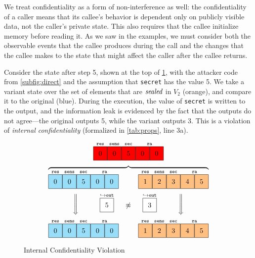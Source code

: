 \documentclass[10pt,conference]{ieeetran}%
\theoremstyle{definition}
\begin{document}
We treat confidentiality as a form of non-interference as well: the confidentiality of a caller
means that its callee's behavior is dependent only on publicly visible data,
not the caller's private state. This also requires that the callee initialize
memory before reading it.
As we saw in the examples, we must consider both the observable events
that the callee produces during the call and the changes that the callee makes to the state that might
affect the caller after the callee returns.

Consider the state after step 5, shown at the top of \cref{fig:variant2},
with the attacker code from \cref{subfig:direct} and the assumption that
{\tt secret} has the value 5. We take a variant state over
the set of elements that are \(\mathit{sealed}\) in \(V_2\) (orange), and compare it to the
original (blue). During the execution, the value of {\tt secret} is written
to the output, and the information leak is evidenced by the fact that the
outputs do not agree---the original outputs 5, while the variant outputs 3.
This is a violation of
{\it internal confidentiality} (formalized in \cref{tab:props}, line 3a).

\newcommand{\leftbox}[1][]{\genbox{20pt}{\leftvariant}{#1}}
\newcommand{\rightbox}[1][]{\genbox{20pt}{\rightvariant}{#1}}

\begin{figure}
    \centering
    \[
    \stackrel{\texttt{res}}{\figfourbox[0]}
    \stackrel{\texttt{sens}}{\figfourbox[0]}
    \stackrel{\texttt{sec}}{\figfourbox[5]}
    \stackrel{\texttt{ra}}{\figfourbox[0]\figfourbox[0]}\]
    \[\overbrace{
    \stackrel{\texttt{res}}{\leftbox[0]}
    \stackrel{\texttt{sens}}{\leftbox[0]}
    \stackrel{\texttt{sec}}{\leftbox[5]}
    \stackrel{\texttt{ra}}{\leftbox[0]\leftbox[0]}
    \hspace{1cm}
    \stackrel{\texttt{res}}{\rightbox[1]}
    \stackrel{\texttt{sens}}{\rightbox[2]}
    \stackrel{\texttt{sec}}{\rightbox[3]}
    \stackrel{\texttt{ra}}{\rightbox[4]\rightbox[5]}}
    \]
    \[\raisebox{.5\height}{\Bigg\Downarrow} \hspace{1cm}
    \stackrel{\hookrightarrow \mathtt{out}}{\genbox{20pt}{white}{5}} \hspace{0.5cm}
    \raisebox{\height}{\(\not\approx\)}
    \hspace{0.5cm}
    \stackrel{\hookrightarrow \mathtt{out}}{\genbox{20pt}{white}{3}} \hspace{1cm}
    \raisebox{.5\height}{\Bigg\Downarrow}
    \]
    \[
    \stackrel{\texttt{res}}{\leftbox[0]}
    \stackrel{\texttt{sens}}{\leftbox[0]}
    \stackrel{\texttt{sec}}{\leftbox[5]}
    \stackrel{\texttt{ra}}{\leftbox[0]\leftbox[0]}
    \hspace{1cm}
    \stackrel{\texttt{res}}{\rightbox[1]}
    \stackrel{\texttt{sens}}{\rightbox[2]}
    \stackrel{\texttt{sec}}{\rightbox[3]}
    \stackrel{\texttt{ra}}{\rightbox[4]\rightbox[5]}
    \]

  \caption{Internal Confidentiality Violation}
  \label{fig:variant2}
\end{figure}
\end{document}
